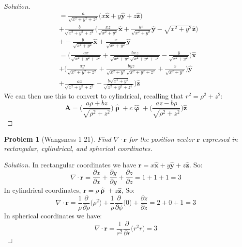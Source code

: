 \documentclass{article}
\theoremstyle{mystyle}
\newtheorem{problem}{Problem}[section]
\begin{document}
\begin{proof}[Solution]
\begin{align*}
                &= \frac{a}{\sqrt{x^{2}+y^{2}+z^{2}}}\bigg(x\hat{\mathbf{x}} + y\hat{\mathbf{y}}+z\hat{\mathbf{z}}\bigg)\\
                &+ \frac{b}{\sqrt{x^{2}+y^{2}+z^{2}}}\bigg(\frac{xz}{\sqrt{x^2+y^2}}\hat{\mathbf{x}} + \frac{yz}{\sqrt{x^{2}+y^{2}}}\hat{\mathbf{y}} - \sqrt{x^2+y^2}\hat{\mathbf{z}}\bigg)\\
                &+ -\frac{y}{\sqrt{x^2+y^2}}\hat{\mathbf{x}} + \frac{x}{\sqrt{x^{2}+y^{2}}}\hat{\mathbf{y}}\\
                &= \bigg(\frac{ax}{\sqrt{x^{2}+y^{2}+z^{2}}}+\frac{bxz}{\sqrt{x^2+y^2}\sqrt{x^{2}+y^{2}+z^{2}}} - \frac{y}{\sqrt{x^2+y^2}}\bigg)\hat{\mathbf{x}}\\
                &+\bigg(\frac{ay}{\sqrt{x^{2}+y^{2}+z^{2}}}+\frac{byz}{\sqrt{x^2+y^2}\sqrt{x^{2}+y^{2}+z^{2}}} + \frac{x}{\sqrt{x^{2}+y^{2}}}\bigg)\hat{\mathbf{y}}\\
                &+ \frac{az}{\sqrt{x^{2}+y^{2}+z^{2}}} - \frac{b\sqrt{x^{2}+y^{2}}}{\sqrt{x^{2}+y^{2}+z^{2}}}\bigg)\hat{\mathbf{z}}
\end{align*}
We can then use this to convert to cylindrical, recalling that $r^{2} = \rho^{2}+z^{2}$:
\begin{equation*}
    \mathbf{A} = \bigg(\frac{a\rho+bz}{\sqrt{\rho^2+z^2}}\bigg)\hat{\boldsymbol{\uprho}}+c\hat{\boldsymbol{\upvarphi}}+\bigg(\frac{az-b\rho}{\sqrt{\rho^2+z^2}}\bigg)\hat{\mathbf{z}}
\end{equation*}
\end{proof}
\begin{problem}[Wangsness 1-21]
Find $\nabla\cdot\mathbf{r}$ for the position vector $\mathbf{r}$ expressed in rectangular, cylindrical, and spherical coordinates.
\end{problem}
\begin{proof}[Solution]
In rectangular coordinates we have $\mathbf{r} = x\hat{\mathbf{x}} + y\hat{\mathbf{y}} + z\hat{\mathbf{z}}$. So:
\begin{equation*}
    \nabla\cdot\mathbf{r}=\frac{\partial x}{\partial x}+\frac{\partial y}{\partial y}+\frac{\partial z}{\partial z}=1+1+1= 3
\end{equation*}
In cylindrical coordinates, $\mathbf{r} = \rho\hat{\boldsymbol{\uprho}} + z\hat{\mathbf{z}}$, So:
\begin{equation*}
    \nabla\cdot\mathbf{r}=\frac{1}{\rho}\frac{\partial}{\partial \rho}\big(\rho^2\big)+\frac{1}{\rho}\frac{\partial}{\partial\phi}\big(0\big)+\frac{\partial z}{\partial z}=2+0+1=3
\end{equation*}
In spherical coordinates we have:
\begin{equation*}
    \nabla\cdot\mathbf{r}=\frac{1}{r^2}\frac{\partial}{\partial r}\big(r^2 r\big)=3
\end{equation*}
\end{proof}
\end{document}
